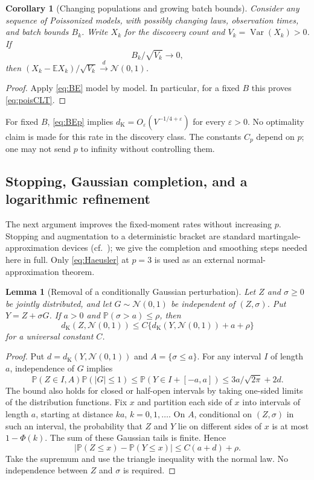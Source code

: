 \documentclass[11pt]{article}
\numberwithin{equation}{section}
\newtheorem{lemma}[theorem]{Lemma}
\newtheorem{corollary}[theorem]{Corollary}
\theoremstyle{definition}
\theoremstyle{remark}
\newcommand{\E}{\mathbb E}
\newcommand{\Pp}{\mathbb P}
\newcommand{\Var}{\operatorname{Var}}
\newcommand{\dK}{d_{\mathrm K}}
\newcommand{\Normal}{\mathcal N(0,1)}
\newcommand{\dto}{\xrightarrow{\ d\ }}
\begin{document}
\begin{corollary}[Changing populations and growing batch bounds]\label{cor:triangular}
Consider any sequence of Poissonized models, with possibly changing laws,
observation times, and batch bounds $B_k$. Write $X_k$ for the discovery count
and $V_k=\Var(X_k)>0$. If
\begin{equation}\label{eq:triangular}
 B_k/\sqrt{V_k}\longrightarrow0,
\end{equation}
then $(X_k-\E X_k)/\sqrt{V_k}\dto\Normal$.
\end{corollary}
\begin{proof}
Apply \eqref{eq:BE} model by model. In particular, for a fixed $B$ this proves
\eqref{eq:poisCLT}.
\end{proof}

For fixed $B$, \eqref{eq:BEp} implies
$\dK=O_\varepsilon(V^{-1/4+\varepsilon})$ for every $\varepsilon>0$.
No optimality claim is made for this rate in the discovery class. The constants
$C_p$ depend on $p$; one may not send $p$ to infinity without controlling them.

\subsection{Stopping, Gaussian completion, and a logarithmic refinement}

The next argument improves the fixed-moment rates without increasing $p$.
Stopping and augmentation to a deterministic bracket are standard
martingale-approximation devices (cf.\ \cite[proof of Theorem~1.5]{Mourrat}); we give the completion and smoothing
steps needed here in full. Only \eqref{eq:Haeusler} at $p=3$ is used as an
external normal-approximation theorem.

\begin{lemma}[Removal of a conditionally Gaussian perturbation]\label{lem:smoothing}
Let $Z$ and $\sigma\ge0$ be jointly distributed, and let $G\sim\Normal$ be
independent of $(Z,\sigma)$. Put $Y=Z+\sigma G$. If $a>0$ and
$\Pp(\sigma>a)\le\rho$, then
\begin{equation}\label{eq:smoothing}
 \dK(Z,\Normal)\le C\{\dK(Y,\Normal)+a+\rho\}
\end{equation}
for a universal constant $C$.
\end{lemma}
\begin{proof}
Put $d=\dK(Y,\Normal)$ and $A=\{\sigma\le a\}$. For any interval $I$ of
length $a$, independence of $G$ implies
\[
 \Pp(Z\in I,A)\Pp(|G|\le1)
 \le\Pp(Y\in I+[-a,a])\le3a/\sqrt{2\pi}+2d.
\]
The bound also holds for closed or half-open intervals by taking one-sided
limits of the distribution functions. Fix $x$ and partition each side of
$x$ into intervals of length $a$, starting at distance $ka$, $k=0,1,\ldots$.
On $A$, conditional on $(Z,\sigma)$ in such an interval, the probability
that $Z$ and $Y$ lie on different sides of $x$ is at most $1-\Phi(k)$.
The sum of these Gaussian tails is finite. Hence
\[
 |\Pp(Z\le x)-\Pp(Y\le x)|\le C(a+d)+\rho.
\]
Take the supremum and use the triangle inequality with the normal law.
No independence between $Z$ and $\sigma$ is required.
\end{proof}
\end{document}
